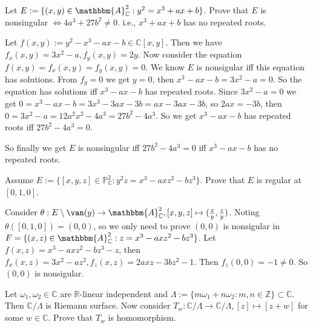 \documentclass{ctexart}
\newif\ifpreface
\begin{document}
\large
\setlength{\baselineskip}{1.2em}
\ifpreface
  
  \newgeometry{left=2cm,right=2cm,top=2cm,bottom=2cm}
\else
  \maketitle
\fi
\begin{problem}
  Let \(E:=\{(x,y) \in \mathbbm{A}_{\mathbb{C}}^2:y^2=x^3+ax+b\}\). Prove that \(E\) is nonsingular \(\iff 4a^3+27b^2 \neq 0\).
  i.e., \(x^3+ax+b\) has no repeated roots.
\end{problem}

\begin{solution}
  Let \(f(x,y):=y^2-x^3-ax-b \in \mathbb{C}[x,y]\). Then we have \(f_x(x,y)=3x^2-a,f_y(x,y)=2y\).
  Now consider the equation \(f(x,y)=f_x(x,y)=f_y(x,y)=0\). We know \(E\) is nonsigular iff this equation has solutions.
  From \(f_y=0\) we get \(y=0\), then \(x^3-ax-b=3x^2-a=0\). So the equation has solutions iff \(x^3-ax-b\) has repeated roots.
  Since \(3x^2-a=0\) we get \(0=x^3-ax-b=3x^3-3ax-3b=ax-3ax-3b\), so \(2ax=-3b\), then \(0=3x^2-a=12a^2x^2-4a^3=27b^2-4a^3\).
  So we get \(x^3-ax-b\) has repeated roots iff \(27b^2-4a^3=0\).

  So finally we get \(E\) is nonsingular iff \(27b^2-4a^3=0 \) iff \(x^3-ax-b\) has no repeated roots.
\end{solution}

\begin{problem}
  Assume \(E:=\{[x,y,z] \in \mathbb{P}_{\mathbb{C}}^2:y^2z=x^3-axz^2-bz^3\}\). Prove that \(E\) is regular at \([0,1,0]\).
\end{problem}

\begin{solution}
  Consider \(\theta:E\setminus \van(y) \to \mathbbm{A}_{\mathbb{C}}^2,[x,y,z] \mapsto (\frac{x}{y}, \frac{z}{y})\).
  Noting \(\theta([0,1,0])=(0,0)\), so we only need to prove \((0,0)\) is nonsigular in \(F=\{(x,z)\in \mathbbm{A}_{\mathbb{C}}^2:z=x^3-axz^2-bz^3\}\).
  Let \(f(x,z)=x^3-axz^2-bz^3-z\), then \(f_x(x,z)=3x^2-az^2,f_z(x,z)=2axz-3bz^2-1\).
  Then \(f_z(0,0)=-1 \neq 0\). So \((0,0)\) is nonsigular.
\end{solution}

\begin{problem}
  Let \(\omega_1,\omega_2 \in \mathbb{C}\) are \(\mathbb{R}\)-linear independent and \(\Lambda:=\{m \omega_1+ n \omega_2:m,n \in \mathbb{Z}\}\subset \mathbb{C}\).
  Then \(\mathbb{C} / \Lambda\) is Riemann surface. Now consider \(T_w:\mathbb{C} / \Lambda \to \mathbb{C} / \Lambda,[z] \mapsto [z + w]\) for some \(w \in \mathbb{C}\).
  Prove that \(T_w\) is homomorphism.
\end{problem}
\end{document}
